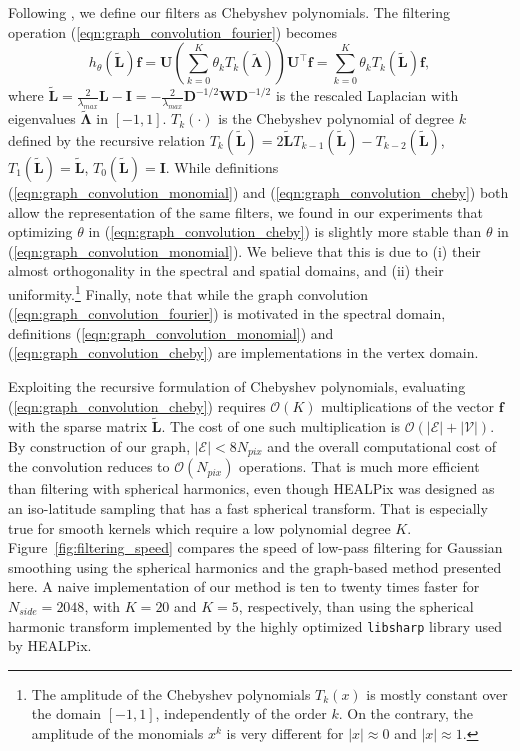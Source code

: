 \documentclass[final,twocolumn,3p,times,sort&compress]{elsarticle}
\newcommand{\figref}[1]{Figure~\ref{fig:#1}}
\newcommand{\eqnref}[1]{(\ref{eqn:#1})}
\renewcommand{\b}[1]{{\bm{#1}}}   %
\newcommand{\1}{\b{1}}              %
\newcommand{\0}{\b{0}}              %
\newcommand{\V}{\mathcal{V}}
\newcommand{\E}{\mathcal{E}}
\renewcommand{\L}{\b{L}}
\newcommand{\tL}{\tilde{\L}}
\newcommand{\W}{\b{W}}
\newcommand{\D}{\b{D}}
\newcommand{\U}{\b{U}}
\newcommand{\f}{\b{f}}
\newcommand{\trans}{^\intercal}
\newcommand{\bLambda}{\b{\Lambda}}
\newcommand{\bO}{\mathcal{O}}
\newcommand{\pkg}[1]{\texttt{#1}}
\begin{document}
Following \citep{defferrard2016convolutional}, we define our filters as Chebyshev polynomials.
The filtering operation \eqnref{graph_convolution_fourier} becomes
\begin{equation} \label{eqn:graph_convolution_cheby}
	h_\theta\left(\tL\right) \f = \U \left(\sum_{k=0}^K \theta_k T_k\left(\tilde{\bLambda}\right) \right) \U\trans \f = \sum_{k=0}^K \theta_k T_k\left(\tL\right) \f,
\end{equation}
where $\tL = \frac{2}{\lambda_{max}} \L - \b{I} = -\frac{2}{\lambda_{max}} \D^{-1/2} \W \D^{-1/2}$ is the rescaled Laplacian with eigenvalues $\tilde{\b \Lambda}$ in $[-1, 1]$.
$T_k(\cdot)$ is the Chebyshev polynomial of degree $k$ defined by the recursive relation $T_k(\tL) = 2\tL T_{k-1}(\tL) - T_{k-2}(\tL)$, $T_1(\tL) = \tL$, $T_0(\tL) = \b{I}$.
While definitions \eqnref{graph_convolution_monomial} and \eqnref{graph_convolution_cheby} both allow the representation of the same filters, we found in our experiments that optimizing $\theta$ in \eqnref{graph_convolution_cheby} is slightly more stable than $\theta$ in \eqnref{graph_convolution_monomial}.
We believe that this is due to (i) their almost orthogonality in the spectral and spatial domains, and (ii) their uniformity.\footnote{The amplitude of the Chebyshev polynomials $T_k(x)$ is mostly constant over the domain $[-1, 1]$, independently of the order $k$. On the contrary, the amplitude of the monomials $x^k$ is very different for $|x|\approx 0$ and $|x| \approx 1$.}
Finally, note that while the graph convolution \eqnref{graph_convolution_fourier} is motivated in the spectral domain, definitions \eqnref{graph_convolution_monomial} and \eqnref{graph_convolution_cheby} are implementations in the vertex domain.

Exploiting the recursive formulation of Chebyshev polynomials, evaluating \eqnref{graph_convolution_cheby} requires $\bO(K)$ multiplications of the vector $\f$ with the sparse matrix $\tL$.
The cost of one such multiplication is $\bO(|\E| + |\V|)$.
By construction of our graph, $|\E| < 8 N_{pix}$ and the overall computational cost of the convolution reduces to $\bO(N_{pix})$ operations.
That is much more efficient than filtering with spherical harmonics, even though HEALPix was designed as an iso-latitude sampling that has a fast spherical transform.
That is especially true for smooth kernels which require a low polynomial degree $K$.
\figref{filtering_speed} compares the speed of low-pass filtering for Gaussian smoothing using the spherical harmonics and the graph-based method presented here.
A naive implementation of our method is ten to twenty times faster for $N_{side} = 2048$, with $K=20$ and $K=5$, respectively, than using the spherical harmonic transform implemented by the highly optimized \pkg{libsharp} \citep{reinecke2013libsharp} library used by HEALPix.
\end{document}
